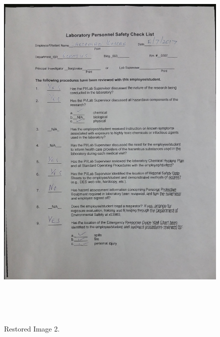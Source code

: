 \begin{figure}[th]
	\centering
	\includegraphics[height=19cm ]{Figures/restored_image2}
	\caption[Restored Image 2]{Restored Image 2.}
	\label{fig:RestoredImage2}
\end{figure}
\pagebreak
